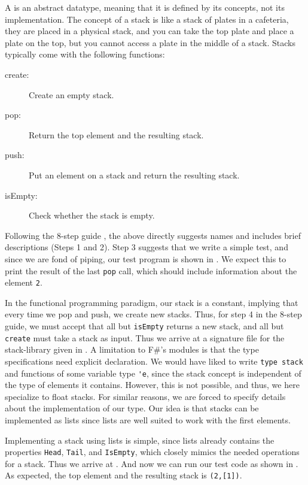 \documentclass[fsharpNotes.tex]{subfiles}
\begin{document}
A  is an abstract datatype, meaning that it is defined by its concepts, not its implementation. The concept of a stack is like a stack of plates in a cafeteria, they are placed in a physical stack, and you can take the top plate and place a plate on the top, but you cannot access a plate in the middle of a stack. Stacks typically come with the following functions:
\begin{description}
\item[create:] Create an empty stack.
\item[pop:] Return the top element and the resulting stack.
\item[push:] Put an element on a stack and return the resulting stack.
\item[isEmpty:] Check whether the stack is empty.
\end{description}
Following the 8-step guide , the above directly suggests names and includes brief descriptions (Steps 1 and 2). Step 3 suggests that we write a simple test, and
since we are fond of piping, our test program is shown in .
We expect this to print the result of the last \lstinline{pop} call, which should include information about the element \lstinline{2}.

In the functional programming paradigm, our stack is a constant, implying that every time we pop and push, we create new stacks. Thus, for step 4 in the 8-step guide, we must accept that all but \lstinline{isEmpty} returns a new stack, and all but \lstinline{create} must take a stack as input. Thus we arrive at a signature file for the stack-library given in .
A limitation to F\#'s modules is that the type specifications need explicit declaration. We would have liked to write \lstinline{type stack} and functions of some variable type \lstinline{'e}, since the stack concept is independent of the type of elements it contains. However, this is not possible, and thus, we here specialize to float stacks. For similar reasons, we are forced to specify details about the implementation of our type. Our idea is that stacks can be implemented as lists since lists are well suited to work with the first elements.

Implementing a stack using lists is simple, since lists already contains the properties \lstinline{Head}, \lstinline{Tail}, and \lstinline{IsEmpty}, which closely mimics the needed operations for a stack. Thus we arrive at .
And now we can run our test code as shown in .
As expected, the top element and the resulting stack is \lstinline{(2,[1])}.
\end{document}
